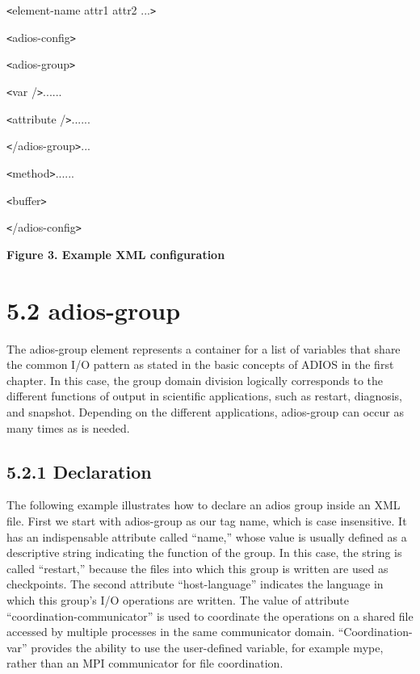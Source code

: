 \texttt{<}element-name attr1 attr2 ...\texttt{>}


\leftskip=28pt
\texttt{<}adios-config\texttt{>}

\leftskip=45pt
\texttt{<}adios-group\texttt{>}

\leftskip=63pt
\texttt{<}var /\texttt{>}......

\texttt{<}attribute /\texttt{>}......

\leftskip=45pt
\texttt{<}/adios-group\texttt{>}...

\texttt{<}method\texttt{>}......

\texttt{<}buffer\texttt{>}

\leftskip=28pt
\texttt{<}/adios-config\texttt{>}

\label{HToc144350162}\label{HRef119578307}

\leftskip=18pt
{\color{color20} \textbf{Figure 3. Example XML configuration\label{HToc82067519}\label{HToc84890242}\label{HToc212016618}\label{HToc212016860}\label{HToc182553365}}}

\section*{{\large 5.2 }{\large \textbf{adios-group}}}

\leftskip=0pt
The adios-group element represents a container for a list of variables that share 
the common I/O pattern as stated in the basic concepts of ADIOS in the first chapter. 
In this case, the group domain division logically corresponds to the different 
functions of output in scientific applications, such as restart, diagnosis, and 
snapshot. Depending on the different applications, adios-group can occur as many 
times as is needed. \label{HToc84890243}\label{HToc212016619}\label{HToc212016861}\label{HToc182553366}

\subsection*{{\large \textbf{5.2.1 Declaration}}}

The following example illustrates how to declare an adios group inside an XML file. 
First we start with adios-group as our tag name, which is case insensitive. It 
has an indispensable attribute called ``name,'' whose value is usually defined 
as a descriptive string indicating the function of the group. In this case, the 
string is called ``restart,'' because the files into which this group is written 
are used as checkpoints. The second attribute ``host-language'' indicates the language 
in which this group's I/O operations are written. The value of attribute ``coordination-communicator'' 
is used to coordinate the operations on a shared file accessed by multiple processes 
in the same communicator domain. ``Coordination-var'' provides the ability to use 
the user-defined variable, for example mype, rather than an MPI communicator for 
file coordination. 


